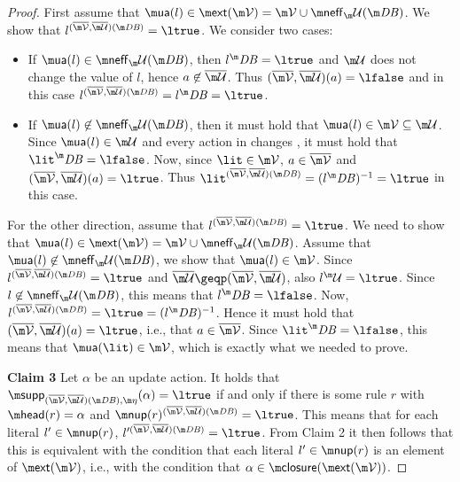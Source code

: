 \begin{proof}
First assume that $\actof(l)\in\ext(\VV)=\VV\cup\neff_\UU(\db)$. We show that $l^{(\overline \VV, \overline \UU)(\db)} = \ltrue$. 
 We consider two cases:
\begin{itemize}
 \item If $\actof(l)\in \neff_\UU(\db)$, then $l^\db = \ltrue$ and $\UU$ does not change the value of $l$, hence $a\not\in\overline\UU$. Thus $(\overline \VV,\overline \UU)(a)=\lfalse$ and in this case $l^{(\overline \VV,\overline \UU)(\db)} = l^\db = \ltrue$. 
 \item If $\actof(l)\not\in \neff_\UU(\db)$, then it must hold that $\actof(l) \in \VV\subseteq \UU$. Since $\actof(l)\in \UU$ and every action in \UU changes \db, it must hold that $\lit^\db=\lfalse$. Now, since $\lit \in \VV$, $a\in \overline \VV$ and $(\overline \VV, \overline \UU) (a) = \ltrue$. Thus $\lit^{(\overline\VV,\overline\UU)(\db)} = (l^\db)^{-1} = \ltrue$ in this case. 
\end{itemize}
For the other direction, assume that $l^{(\overline \VV, \overline \UU)(\db)} = \ltrue$. We need to show that $\actof(l)\in\ext(\VV)=\VV\cup\neff_\UU(\db)$. Assume that $\actof(l)\not\in \neff_\UU(\db)$, we show that $\actof(l)\in \VV$. 
Since $l^{(\overline \VV, \overline \UU)(\db)} = \ltrue$ and $\overline\UU\geqp (\overline\VV,\overline\UU)$, also $l^\UU=\ltrue$. Since $l\not\in \neff_\UU(\db)$, this means that $l^\db=\lfalse$.
Now,
$l^{(\overline \VV, \overline \UU)(\db)} = \ltrue = (l^\db)^{-1}$. Hence it must hold that $(\overline \VV,\overline \UU)(a) = \ltrue$, i.e., that $a\in \overline \VV$. Since $\lit^\db = \lfalse$, this means that $  \actof{(\lit)}\in \VV$, which is exactly what we needed to prove. 


\textbf{Claim 3} 
Let $\alpha$ be an update action. 
It holds that  $\supp_{(\overline\VV,\overline\UU)(\db),\aics}(\alpha) = \ltrue$ if and only if there is some rule $r$ with $\head(r)=\alpha$ and $\nup(r)^{ (\overline\VV, \overline\UU)(\db)} = \ltrue$. This means that for each literal $l'\in \nup(r)$, $l'^{(\overline\VV, \overline\UU)(\db)} = \ltrue$. From Claim 2 it then follows that this is equivalent with the condition that each literal $l'\in\nup(r)$ is an element of   $\ext(\VV)$, i.e., with  the condition that $\alpha \in \closure(\ext(\VV))$. 



\end{proof}

